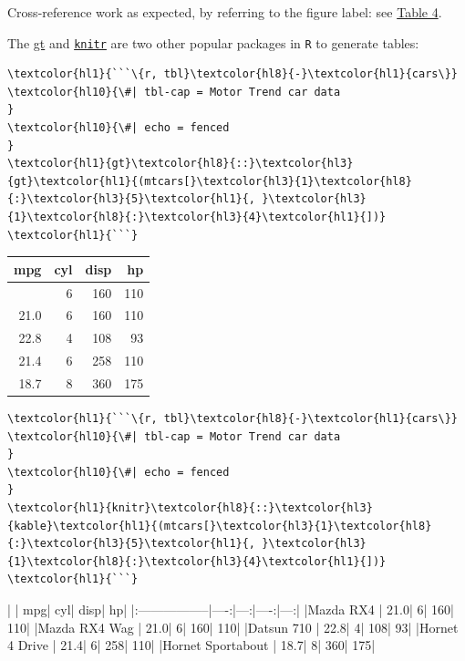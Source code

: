 Cross-reference work as expected, by referring to the figure label: see \hyperref[tbl-cars]{Table 4}.

The \href{https://gt.rstudio.com/}{gt} and \href{https://yihui.org/knitr/}{\texttt{knitr}} are two other popular packages in \texttt{R} to generate tables:




\begin{srccode}
\begin{Verbatim}[commandchars=\\\{\}]
\textcolor{hl1}{```\{r, tbl}\textcolor{hl8}{-}\textcolor{hl1}{cars\}}
\textcolor{hl10}{\#| tbl-cap = Motor Trend car data
}
\textcolor{hl10}{\#| echo = fenced
}
\textcolor{hl1}{gt}\textcolor{hl8}{::}\textcolor{hl3}{gt}\textcolor{hl1}{(mtcars[}\textcolor{hl3}{1}\textcolor{hl8}{:}\textcolor{hl3}{5}\textcolor{hl1}{, }\textcolor{hl3}{1}\textcolor{hl8}{:}\textcolor{hl3}{4}\textcolor{hl1}{])}
\textcolor{hl1}{```}
\end{Verbatim}
\end{srccode}

\begin{table}[t]
\fontsize{12.0pt}{14.0pt}\selectfont
\begin{tabular*}{\linewidth}{@{\extracolsep{\fill}}rrrr}
\toprule
mpg & cyl & disp & hp \\ 
\midrule\addlinespace[2.5pt]
21.0 & 6 & 160 & 110 \\ 
21.0 & 6 & 160 & 110 \\ 
22.8 & 4 & 108 & 93 \\ 
21.4 & 6 & 258 & 110 \\ 
18.7 & 8 & 360 & 175 \\ 
\bottomrule
\end{tabular*}
\end{table}


\begin{srccode}
\begin{Verbatim}[commandchars=\\\{\}]
\textcolor{hl1}{```\{r, tbl}\textcolor{hl8}{-}\textcolor{hl1}{cars\}}
\textcolor{hl10}{\#| tbl-cap = Motor Trend car data
}
\textcolor{hl10}{\#| echo = fenced
}
\textcolor{hl1}{knitr}\textcolor{hl8}{::}\textcolor{hl3}{kable}\textcolor{hl1}{(mtcars[}\textcolor{hl3}{1}\textcolor{hl8}{:}\textcolor{hl3}{5}\textcolor{hl1}{, }\textcolor{hl3}{1}\textcolor{hl8}{:}\textcolor{hl3}{4}\textcolor{hl1}{])}
\textcolor{hl1}{```}
\end{Verbatim}
\end{srccode}

\begin{table}
\centering
\caption{Motor Trend car data}
\label{tbl-cars}


|                  |  mpg| cyl| disp|  hp|
|:-----------------|----:|---:|----:|---:|
|Mazda RX4         | 21.0|   6|  160| 110|
|Mazda RX4 Wag     | 21.0|   6|  160| 110|
|Datsun 710        | 22.8|   4|  108|  93|
|Hornet 4 Drive    | 21.4|   6|  258| 110|
|Hornet Sportabout | 18.7|   8|  360| 175|
\end{table}